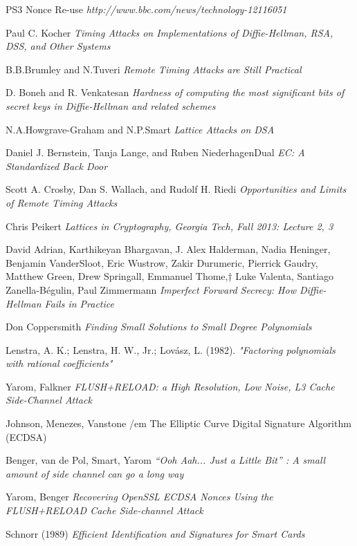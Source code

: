 \documentclass[a4paper,11pt]{article}
\begin{document}
\newpage
\begin{thebibliography}{1}

 PS3 Nonce Re-use {\em http://www.bbc.com/news/technology-12116051}

 Paul C. Kocher {\em Timing Attacks on Implementations of Diffie-Hellman, RSA, DSS, and Other Systems}

 B.B.Brumley and N.Tuveri {\em Remote Timing Attacks are Still Practical}

 D. Boneh and R. Venkatesan {\em Hardness of computing the most significant bits of secret keys in Diffie-Hellman and related schemes}

 N.A.Howgrave-Graham and N.P.Smart {\em Lattice Attacks on DSA}

 Daniel J. Bernstein, Tanja Lange, and Ruben NiederhagenDual {\em EC: A Standardized Back Door}

 Scott A. Crosby, Dan S. Wallach, and Rudolf H. Riedi {\em Opportunities and Limits of Remote Timing Attacks}

 Chris Peikert {\em Lattices in Cryptography, Georgia Tech, Fall 2013: Lecture 2, 3}

 David Adrian, Karthikeyan Bhargavan, J. Alex Halderman, Nadia Heninger, Benjamin VanderSloot, Eric Wustrow, Zakir Durumeric, Pierrick Gaudry, Matthew Green, Drew Springall, Emmanuel Thome,† Luke Valenta, Santiago Zanella-Bégulin, Paul Zimmermann {\em Imperfect Forward Secrecy: How Diffie-Hellman Fails in Practice}

 Don Coppersmith {\em Finding Small Solutions to Small Degree Polynomials}

 Lenstra, A. K.; Lenstra, H. W., Jr.; Lovász, L. (1982). {\em "Factoring polynomials with rational coefficients"}

 Yarom, Falkner {\em FLUSH+RELOAD: a High Resolution, Low Noise, L3 Cache Side-Channel Attack}

 Johnson, Menezes, Vanstone {/em The Elliptic Curve Digital Signature Algorithm (ECDSA)}

 Benger, van de Pol, Smart, Yarom {\em “Ooh Aah... Just a Little Bit” : A small amount of side channel can go a long way}

 Yarom, Benger {\em Recovering OpenSSL ECDSA Nonces Using the FLUSH+RELOAD Cache Side-channel Attack}

 Schnorr (1989) {\em Efficient Identification and Signatures for Smart Cards}

\end{thebibliography}


\end{document}
